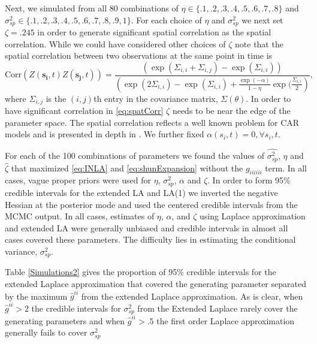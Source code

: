 \documentclass[11pt]{isuthesis}
\begin{document}
	
	Next, we simulated from all 80 combinations of $\eta \in \{.1,.2,.3,.4,.5,.6,.7,.8\}$ and $\sigma_{sp}^2 \in \{.1,.2,.3,.4,.5,.6,.7,.8,.9,1\}$.  For each choice of $\eta$ and $\sigma_{sp}^2$ we next set $\zeta=.245$ in order to generate significant spatial correlation as the spatial correlation.  While we could have considered other choices of $\zeta$ note that the spatial correlation between two observations at the same point in time is
	\begin{equation}
	\mbox{Corr}(Z(\boldsymbol{s_i},t)Z(\boldsymbol{s_j},t))  = \frac{\left(\exp(\Sigma_{i,i}+\Sigma_{i,j}) -\exp(\Sigma_{i,i})\right)}{\left(\exp(2\Sigma_{i,i}) -\exp(\Sigma_{i,i}) + \frac{\exp(-\alpha)}{1-\eta}\exp(\frac{\Sigma_{i,i}}{2}\right)}\label{eq:spatCorr},
	\end{equation}
	where $\Sigma_{i,j}$ is the $(i,j)$th entry in the covariance matrix, $\Sigma(\theta)$.  In order to have significant correlation in \eqref{eq:spatCorr} $\zeta$ needs to be near the edge of the parameter space.  The spatial correlation reflects a well known problem for CAR models and is presented in depth in \cite{wall2004close}.  We further fixed $\alpha(s_i,t)=0,\forall s_i,t$. 
	
	For each of the 100 combinations of parameters we found the values of $\hat{\sigma_{sp}^2}$, $\hat{\eta}$ and $\hat{\zeta}$ that maximized \eqref{eq:INLA} and \eqref{eq:shunExpansion} without the $g_{iiiiii}$ term.  In all cases, vague proper priors were used for $\eta$, $\sigma_{sp}^2$, $\alpha$ and $\zeta$.  In order to form 95\% credible intervals for the extended LA and LA(1) we inverted the negative Hessian at the posterior mode and used the centered credible intervals from the MCMC output. In all cases, estimates of $\eta$, $\alpha$, and $\zeta$ using Laplace approximation and extended LA were generally unbiased and credible intervals in almost all cases covered these parameters.  The difficulty lies in estimating the conditional variance, $\sigma_{sp}^2$.  
	
	 Table \ref{Simulations2} gives the proportion of 95\% credible intervals for the extended Laplace approximation that covered the generating parameter separated by the maximum $\hat{g}^{ii}$ from the extended Laplace approximation.  As is clear, when $\hat{g}^{ii}>2$ the credible intervals for $\sigma^2_{sp}$ from the Extended Laplace rarely cover the generating parameters and when $\hat{g}^{ii}>.5$ the first order Laplace approximation generally fails to cover $\sigma^2_{sp}$
	
\end{document}
